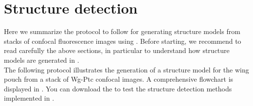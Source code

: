 \section{Structure detection}\label{sec:protocol_structure}
Here we summarize the protocol to follow for generating structure models from stacks of confocal fluorescence images using \wingj. Before starting, we recommend to read carefully the above sections, in particular  to understand how structure models are generated in \wingj.\\

The following protocol illustrates the generation of a structure model for the \droso wing pouch from a stack of Wg-Ptc confocal images. A comprehensive flowchart is displayed in . You can download the \wingjBenchmarkImages to test the structure detection methods implemented in \wingj.

